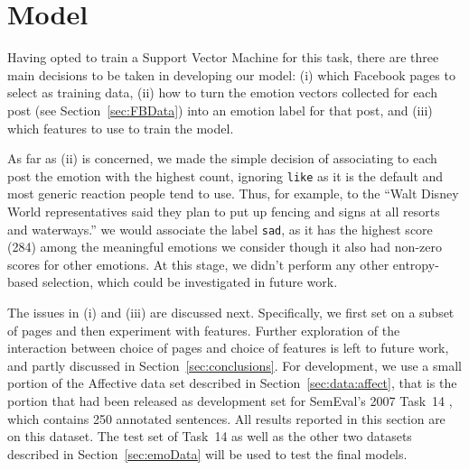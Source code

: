 \documentclass[11pt]{article}
\begin{document}




\section{Model}
\label{sec:model}


Having opted to train a Support Vector Machine for this task, there are three main decisions to be taken in developing our model: (i) which Facebook pages to select as training data, (ii) how to turn the emotion vectors collected for each post (see Section~\ref{sec:FBData}) into an emotion label for that post, and (iii) which features to use to train the model. 

As far as (ii) is concerned, we made the simple decision of associating to each post the emotion with the highest count, ignoring \texttt{like} as it is the default and most generic reaction people tend to use. Thus, for example, to the ``Walt Disney World representatives said 
  they plan to put up fencing and signs at all resorts 
  and waterways.'' 
  we would associate the label \texttt{sad}, as it has the highest score (284) among the meaningful emotions we consider though it also had non-zero scores for other emotions. At this stage, we didn't perform any other entropy-based selection, which could be investigated in future work.
  
  The issues in (i) and (iii) are discussed next. Specifically, we first set on a subset of pages and then experiment with features. Further exploration of the interaction between choice of pages and choice of features is left to future work, and partly discussed in Section~\ref{sec:conclusions}. For development, we use a small portion of the Affective data set described in Section~\ref{sec:data:affect}, that is the portion that had been released as development set for SemEval's 2007 Task~14 \cite{strapparava2007semeval}, which contains 250 annotated sentences. All results reported in this section are on this dataset.
  The test set of Task~14 as well as the other two datasets described in Section~\ref{sec:emoData} will be used to test the final models.
\end{document}
